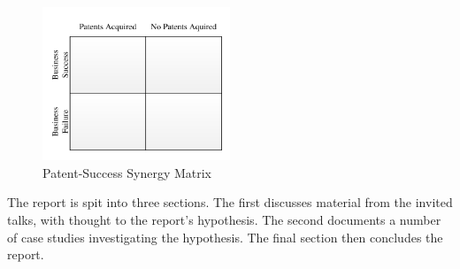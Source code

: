 \begin{figure}
\centering
\includegraphics[width=0.5\textwidth]{./Figures/SuccessMatrix.pdf}
\caption{Patent-Success Synergy Matrix }
\label{fig:synergymatrix}
\end{figure}

The report is spit into three sections. 
The first discusses material from the invited talks, with thought to the report's hypothesis.
The second documents a number of case studies investigating the hypothesis.
The final section then concludes the report.

